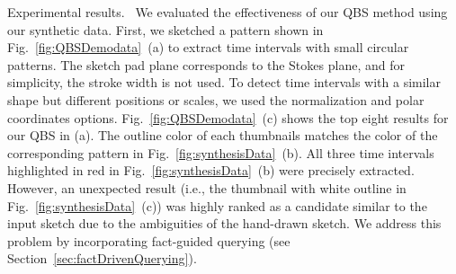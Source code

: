 %
\textsf{Experimental results.\ } We evaluated the effectiveness of our QBS method using our synthetic data.
First, we sketched a pattern shown in Fig.~\ref{fig:QBSDemodata}~(a) to extract time intervals with small circular patterns.
The sketch pad plane corresponds to the Stokes plane, and for simplicity, the stroke width is not used.
To detect time intervals with a similar shape but different positions or scales, we used the normalization and polar coordinates options.
Fig.~\ref{fig:QBSDemodata}~(c) shows the top eight results for our QBS in (a).
The outline color of each thumbnails matches the color of the corresponding pattern in Fig.~\ref{fig:synthesisData}~(b).
All three time intervals highlighted in red in Fig.~\ref{fig:synthesisData}~(b) were precisely extracted.
However, an unexpected result (i.e., the thumbnail with white outline in Fig.~\ref{fig:synthesisData}~(c)) was highly ranked as a candidate similar to the input sketch due to the ambiguities of the hand-drawn sketch.
We address this problem by incorporating fact-guided querying (see Section~\ref{sec:factDrivenQuerying}). 

%
